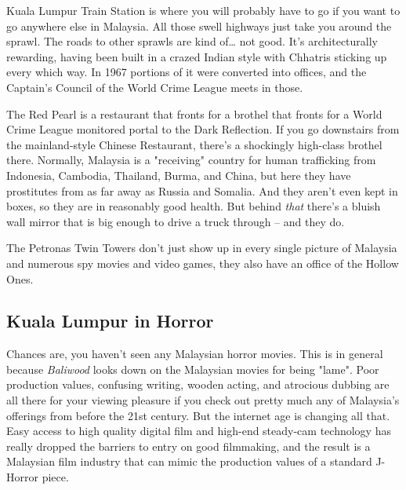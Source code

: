 Kuala Lumpur Train Station is where you will probably have to go if you want to go anywhere else in Malaysia. All those swell highways just take you around the sprawl. The roads to other sprawls are kind of\ldots{} not good. It's architecturally rewarding, having been built in a crazed Indian style with Chhatris sticking up every which way. In 1967 portions of it were converted into offices, and the Captain's Council of the World Crime League meets in those.

The Red Pearl is a restaurant that fronts for a brothel that fronts for a World Crime League monitored portal to the Dark Reflection. If you go downstairs from the mainland-style Chinese Restaurant, there's a shockingly high-class brothel there. Normally, Malaysia is a "receiving" country for human trafficking from Indonesia, Cambodia, Thailand, Burma, and China, but here they have prostitutes from as far away as Russia and Somalia. And they aren't even kept in boxes, so they are in reasonably good health. But behind \textit{that} there's a bluish wall mirror that is big enough to drive a truck through -- and they do.

The Petronas Twin Towers don't just show up in every single picture of Malaysia and numerous spy movies and video games, they also have an office of the Hollow Ones.

\subsection{Kuala Lumpur in Horror}

\hspace{\parindent} Chances are, you haven't seen any Malaysian horror movies. This is in general because \textit{Baliwood} looks down on the Malaysian movies for being "lame". Poor production values, confusing writing, wooden acting, and atrocious dubbing are all there for your viewing pleasure if you check out pretty much any of Malaysia's offerings from before the 21st century. But the internet age is changing all that. Easy access to high quality digital film and high-end steady-cam technology has really dropped the barriers to entry on good filmmaking, and the result is a Malaysian film industry that can mimic the production values of a standard J-Horror piece.

